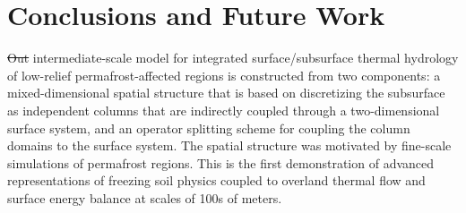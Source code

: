 \documentclass[review,11pt]{elsarticle}
\providecommand{\DIFadd}[1]{{\protect\color{blue}\uwave{#1}}} %
\providecommand{\DIFdel}[1]{{\protect\color{red}\sout{#1}}}                      %
\providecommand{\DIFaddbegin}{} %
\providecommand{\DIFaddend}{} %
\providecommand{\DIFdelbegin}{} %
\providecommand{\DIFdelend}{} %
\begin{document}
\section{Conclusions and Future Work}\label{conclusion}

\DIFdelbegin \DIFdel{Out }\DIFdelend \DIFaddbegin \DIFadd{Our }\DIFaddend intermediate-scale model for integrated surface/subsurface thermal hydrology of low-relief permafrost-affected regions is constructed from two components: a mixed-dimensional spatial structure that is based on discretizing  the subsurface as independent columns that are indirectly coupled through a two-dimensional surface system, and an operator splitting scheme for coupling the column domains to the surface system. The spatial structure was motivated by fine-scale simulations of permafrost regions. This is the first demonstration of advanced representations of freezing soil physics coupled to overland thermal flow and surface energy balance at scales of 100s of meters.




\end{document}
